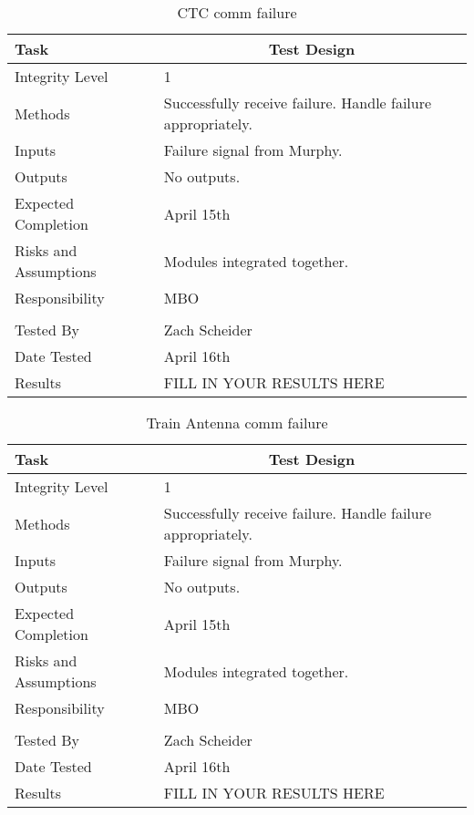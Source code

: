 \documentclass[]{article}
\begin{document}
\begin{table}[H]
	\centering
	\caption{CTC comm failure}
	\begin{tabular}{|l|l|}
		\hline
		Task & \multicolumn{1}{c|}{Test Design} \\ \hline
		Integrity Level & 1 \\ \hline
		Methods & \parbox[t]{10cm}{Successfully receive failure. Handle failure appropriately. }\\ \hline
		Inputs &  \parbox[t]{10cm}{Failure signal from Murphy. } \\ \hline
		Outputs &  \parbox[t]{10cm}{No outputs. } \\ \hline
		Expected Completion & April 15th \\ \hline
		Risks and Assumptions & \parbox[t]{10cm}{Modules integrated together.}  \\ \hline		
		Responsibility & MBO\\ \hline
			\\ \hline
		Tested By   &  Zach Scheider\\	\hline
		Date Tested & \parbox[t]{10cm}{April 16th}\\ \hline
		Results & FILL IN YOUR RESULTS HERE\\ \hline
	\end{tabular}
\end{table}

\begin{table}[H]
	\centering
	\caption{Train Antenna comm failure}
	\begin{tabular}{|l|l|}
		\hline
		Task & \multicolumn{1}{c|}{Test Design} \\ \hline
		Integrity Level & 1 \\ \hline
		Methods & \parbox[t]{10cm}{Successfully receive failure. Handle failure appropriately. }\\ \hline
		Inputs &  \parbox[t]{10cm}{Failure signal from Murphy. } \\ \hline
		Outputs &  \parbox[t]{10cm}{No outputs. } \\ \hline
		Expected Completion & April 15th \\ \hline
		Risks and Assumptions & \parbox[t]{10cm}{Modules integrated together.}  \\ \hline
		Responsibility & MBO\\ \hline
			\\ \hline
		Tested By   &  Zach Scheider\\	\hline
		Date Tested & \parbox[t]{10cm}{April 16th}\\ \hline
		Results & FILL IN YOUR RESULTS HERE\\ \hline
	\end{tabular}
\end{table}
\end{document}
